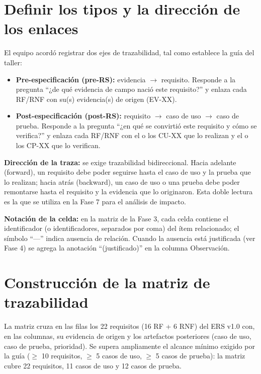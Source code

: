 \documentclass[12pt,a4paper]{article}
\begin{document}
\section{ Definir los tipos y la dirección de los enlaces }

El equipo acordó registrar dos ejes de trazabilidad, tal como establece la guía del taller:

\begin{itemize}[leftmargin=*]
    \item \textbf{Pre-especificación (pre-RS):} evidencia $\rightarrow$ requisito. Responde a la pregunta ``¿de qué evidencia de campo nació este requisito?'' y enlaza cada RF/RNF con su(s) evidencia(s) de origen (EV-XX).
    \item \textbf{Post-especificación (post-RS):} requisito $\rightarrow$ caso de uso $\rightarrow$ caso de prueba. Responde a la pregunta ``¿en qué se convirtió este requisito y cómo se verifica?'' y enlaza cada RF/RNF con el o los CU-XX que lo realizan y el o los CP-XX que lo verifican.
\end{itemize}

\textbf{Dirección de la traza:} se exige trazabilidad bidireccional. Hacia adelante (forward), un requisito debe poder seguirse hasta el caso de uso y la prueba que lo realizan; hacia atrás (backward), un caso de uso o una prueba debe poder remontarse hasta el requisito y la evidencia que lo originaron. Esta doble lectura es la que se utiliza en la Fase 7 para el análisis de impacto.

\textbf{Notación de la celda:} en la matriz de la Fase 3, cada celda contiene el identificador (o identificadores, separados por coma) del ítem relacionado; el símbolo ``---'' indica ausencia de relación. Cuando la ausencia está justificada (ver Fase 4) se agrega la anotación ``(justificado)'' en la columna Observación.

\section{ Construcción de la matriz de trazabilidad }

La matriz cruza en las filas los 22 requisitos (16 RF + 6 RNF) del ERS v1.0 con, en las columnas, su evidencia de origen y los artefactos posteriores (caso de uso, caso de prueba, prioridad). Se supera ampliamente el alcance mínimo exigido por la guía ($\geq$ 10 requisitos, $\geq$ 5 casos de uso, $\geq$ 5 casos de prueba): la matriz cubre 22 requisitos, 11 casos de uso y 12 casos de prueba.
\end{document}
